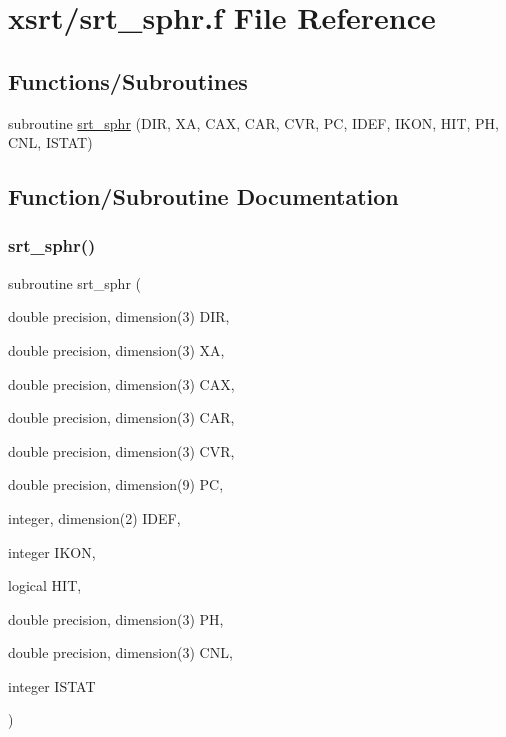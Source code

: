 \hypertarget{srt__sphr_8f}{}\section{xsrt/srt\+\_\+sphr.f File Reference}
\label{srt__sphr_8f}
\subsection*{Functions/\+Subroutines}
\begin{DoxyCompactItemize}
\item 
subroutine \hyperlink{srt__sphr_8f_ac92002e0f2326565b22e2c43bf82f782}{srt\+\_\+sphr} (D\+IR, XA, C\+AX, C\+AR, C\+VR, PC, I\+D\+EF, I\+K\+ON, H\+IT, PH, C\+NL, I\+S\+T\+AT)
\end{DoxyCompactItemize}


\subsection{Function/\+Subroutine Documentation}
\mbox{\label{srt__sphr_8f_ac92002e0f2326565b22e2c43bf82f782}} 
\subsubsection{\texorpdfstring{srt\+\_\+sphr()}{srt\_sphr()}}
{\footnotesize\ttfamily subroutine srt\+\_\+sphr (\begin{DoxyParamCaption}\item[{double precision, dimension(3)}]{D\+IR,  }\item[{double precision, dimension(3)}]{XA,  }\item[{double precision, dimension(3)}]{C\+AX,  }\item[{double precision, dimension(3)}]{C\+AR,  }\item[{double precision, dimension(3)}]{C\+VR,  }\item[{double precision, dimension(9)}]{PC,  }\item[{integer, dimension(2)}]{I\+D\+EF,  }\item[{integer}]{I\+K\+ON,  }\item[{logical}]{H\+IT,  }\item[{double precision, dimension(3)}]{PH,  }\item[{double precision, dimension(3)}]{C\+NL,  }\item[{integer}]{I\+S\+T\+AT }\end{DoxyParamCaption})}

